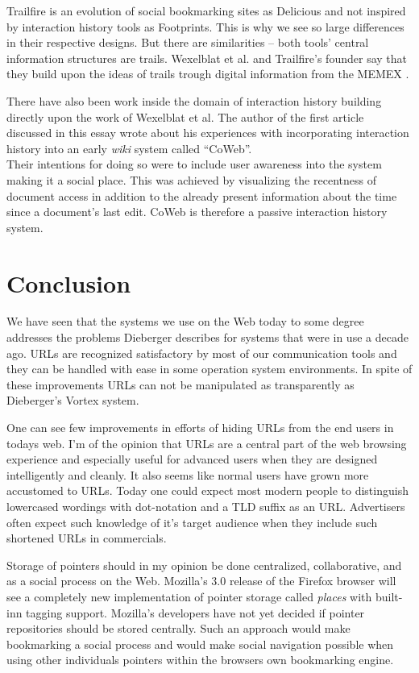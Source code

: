 \documentclass[12pt,a4paper]{article}
\begin{document}
Trailfire is an evolution of social bookmarking sites as Delicious and not
inspired by interaction history tools as Footprints. This is why we see so
large differences in their respective designs. But there are similarities --
both tools' central information structures are trails. Wexelblat et al. and
Trailfire's founder \cite{ohalloran07} say that they build upon the ideas of
trails trough digital information from the MEMEX \cite{bush45}.

There have also been work inside the domain of interaction history building
directly upon the work of Wexelblat et al. The author of the first article
discussed in this essay wrote about his experiences with
incorporating interaction history into an early \emph{wiki} system called
``CoWeb''.
\\ \cite{dieberger00} Their intentions for doing so were to include
user awareness into
the system making it a social place. This was achieved by visualizing the
recentness of document access in addition to the already present information
about the time since a document's last edit. CoWeb is therefore a passive
interaction history system.

\section{Conclusion}

We have seen that the systems we use on the Web today to some degree addresses
the problems Dieberger describes for systems that were in use a decade ago.
URLs are recognized satisfactory by most of our communication tools and they
can be handled with ease in some operation system environments. In spite of
these improvements URLs can not be manipulated as transparently as Dieberger's
Vortex system.

One can see few improvements in efforts of hiding URLs from the end users in
todays web. I'm of the opinion that URLs are a central part of the web
browsing experience and especially useful for advanced users when they are
designed intelligently and cleanly. It also seems like normal users have grown
more accustomed to URLs. Today one could expect most modern people to
distinguish lowercased wordings with dot-notation and a TLD suffix as an URL.
Advertisers often expect such knowledge of it's target audience when they
include such shortened URLs in commercials.

Storage of pointers should in my opinion be done
centralized, collaborative, and as a social  process on the Web. Mozilla's 3.0
release of the Firefox browser will see a completely new implementation of
pointer storage called \emph{places} \cite{places07} with built-inn tagging
support. Mozilla's developers have not yet decided if pointer repositories
should be stored centrally. Such an approach would make bookmarking a social
process and would make social navigation possible when using other
individuals pointers within the browsers own bookmarking engine.
\end{document}
